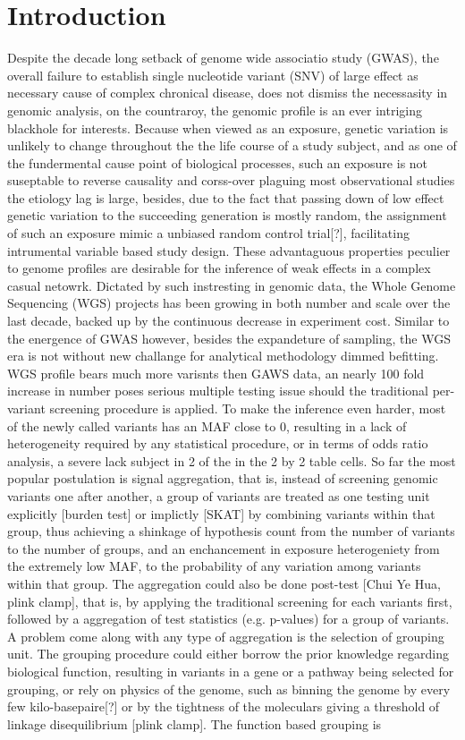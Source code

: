 \documentclass[twocolumn]{article}
\begin{document}
\section{Introduction}
Despite the decade long setback of genome wide associatio study (GWAS), the overall failure to establish single nucleotide variant (SNV) of large effect as necessary cause of complex chronical disease, does not dismiss the necessasity in genomic analysis, on the countraroy, the genomic profile is an ever intriging blackhole for interests. Because when viewed as an exposure, genetic variation is unlikely to change throughout the the life course of a study subject, and as one of the fundermental cause point of biological processes, such an exposure is not suseptable to reverse causality and corss-over plaguing most observational studies the etiology lag is large, besides, due to the fact that passing down of low effect genetic variation to the succeeding generation is mostly random, the assignment of such an exposure mimic a unbiased random control trial[?], facilitating intrumental variable based study design. These advantaguous properties peculier to genome profiles are desirable for the inference of weak effects in a complex casual netowrk. Dictated by such instresting in genomic data, the Whole Genome Sequencing (WGS) projects has been growing in both number and scale over the last decade, backed up by the continuous decrease in experiment cost. Similar to the energence of GWAS however, besides the expandeture of sampling, the WGS era is not without new challange for analytical methodology dimmed befitting. WGS profile bears much more varisnts then GAWS data, an nearly 100 fold increase in number poses serious multiple testing issue should the traditional per-variant screening procedure is applied. To make the inference even harder, most of the newly called variants has an MAF close to 0, resulting in a lack of heterogeneity required by any statistical procedure, or in terms of odds ratio analysis, a severe lack subject in 2 of the in the 2 by 2 table cells. So far the most popular postulation is signal aggregation, that is, instead of screening genomic variants one after another, a group of variants are treated as one testing unit explicitly [burden test] or implictly [SKAT] by combining variants within that group, thus achieving a shinkage of hypothesis count from the number of variants to the number of groups, and an enchancement in exposure heterogeniety from the extremely low MAF, to the probability of any variation among variants within that group. The aggregation could also be done post-test [Chui Ye Hua, plink clamp], that is, by applying the traditional screening for each variants first, followed by a aggregation of test statistics (e.g. p-values) for a group of variants. A problem come along with any type of aggregation is the selection of grouping unit. The grouping procedure could either borrow the prior knowledge regarding biological function, resulting in variants in a gene or a pathway being selected for grouping, or rely on physics of the genome, such as binning the genome by every few kilo-basepaire[?] or by the tightness of the moleculars giving a threshold of linkage disequilibrium [plink clamp]. The function based grouping is 
\end{document}
